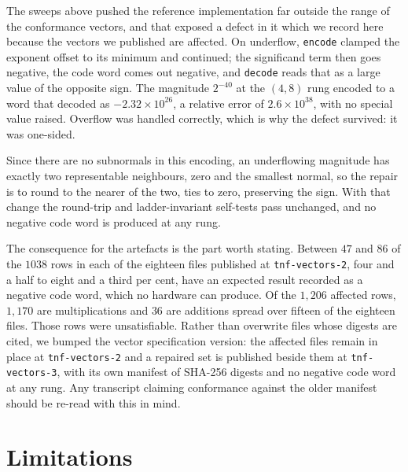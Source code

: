 The sweeps above pushed the reference implementation far outside the range of the
conformance vectors, and that exposed a defect in it which we record here because
the vectors we published are affected. On underflow, \texttt{encode} clamped the
exponent offset to its minimum and continued; the significand term then goes
negative, the code word comes out negative, and \texttt{decode} reads that as a
large value of the opposite sign. The magnitude $2^{-40}$ at the $(4,8)$ rung
encoded to a word that decoded as $-2.32\times 10^{26}$, a relative error of
$2.6\times 10^{38}$, with no special value raised. Overflow was handled correctly,
which is why the defect survived: it was one-sided.

Since there are no subnormals in this encoding, an underflowing magnitude has
exactly two representable neighbours, zero and the smallest normal, so the repair
is to round to the nearer of the two, ties to zero, preserving the sign. With that
change the round-trip and ladder-invariant self-tests pass unchanged, and no
negative code word is produced at any rung.

The consequence for the artefacts is the part worth stating. Between $47$ and
$86$ of the $1038$ rows in each of the eighteen files published at
\texttt{tnf-vectors-2}, four and a half to eight and a third per cent, have an
expected result recorded as a negative code word, which no hardware can produce.
Of the $1{,}206$ affected rows, $1{,}170$ are multiplications and $36$ are
additions spread over fifteen of the eighteen files. Those rows were
unsatisfiable. Rather than overwrite files whose digests are cited, we bumped the
vector specification version: the affected files remain in place at
\texttt{tnf-vectors-2} and a repaired set is published beside them at
\texttt{tnf-vectors-3}, with its own manifest of SHA-256 digests and no negative
code word at any rung. Any transcript
claiming conformance against the older manifest should be re-read with this in
mind.

\section{Limitations}\label{sec:limitations-anchor}\label{sec:limits}



